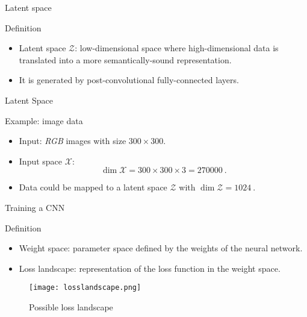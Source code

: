 \begin{frame}{Latent space}
    \begin{definitionblock}{Definition}
        \centering
        \begin{itemize}
            \item<1-> Latent space $\mathcal{Z}$: low-dimensional space where high-dimensional data is translated into a more semantically-sound representation.
            \item <2-> It is generated by post-convolutional fully-connected layers.
        \end{itemize}
    \end{definitionblock}
\end{frame}

\begin{frame}{Latent Space}
    \begin{normalblock}{Example: image data}
        \begin{itemize}
            \item <1-> Input: \emph{RGB} images with size $300 \times 300$.
            \item <2-> Input space $\mathcal{X}$:
            \[
                \dim{\mathcal{X}} = 300\times300\times3 = \SI{270000}{}.
            \]
            \item <3-> Data could be mapped to a latent space $\mathcal{Z}$ with $\dim \mathcal{Z}= \SI{1024}{}$.
        \end{itemize}
    \end{normalblock}
\end{frame}

\begin{frame}{Training a CNN}
    \begin{definitionblock}{Definition}
        \begin{itemize}
            \item <1-> Weight space: parameter space defined by the weights of the neural network.
            \item <2-> Loss landscape: representation of the loss function in the weight space.
        \end{itemize}
    \end{definitionblock}
    \begin{figure}
        \texttt{[image: losslandscape.png]}
        \caption*{Possible loss landscape}
    \end{figure}
\end{frame}

